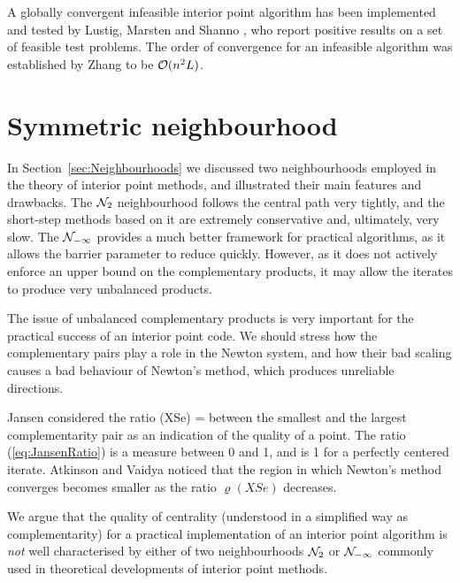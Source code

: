 A globally convergent infeasible interior point algorithm has
been implemented and tested by Lustig, Marsten and Shanno
\cite{LustigMarstenShanno94b}, who report positive results on
a set of feasible test problems.
The order of convergence for an infeasible algorithm was
established by Zhang \cite{Zhang94} to be $\mathcal{O}(n^2L)$.


%
%
\section{Symmetric neighbourhood}
\label{sec:SymNeighbourhood}

In Section~\ref{sec:Neighbourhoods} we discussed two neighbourhoods
employed in the theory of interior point methods, 
and illustrated their main features and drawbacks.
The $\mathcal{N}_2$ neighbourhood follows the central path very tightly, 
and the short-step methods
based on it are extremely conservative and, ultimately, very slow.
The $\mathcal{N}_{-\infty}$ provides a much better framework 
for practical algorithms, as it allows 
the barrier parameter to reduce quickly. However, as it does not actively
enforce an upper bound on the complementary products, it may allow the
iterates to produce very unbalanced products.

The issue of unbalanced complementary products is very important for
the practical success of an interior point code. 
We should stress how
the complementary pairs play a role in the Newton system, and how
their bad scaling causes a bad behaviour of Newton's method, which
produces unreliable directions.

Jansen \cite{phd:Jansen} considered the ratio 
\be  \label{eq:JansenRatio}
  \varrho(XSe) = 
\ee
between the smallest and the largest complementarity pair as an 
indication of the quality of a point.
The ratio (\ref{eq:JansenRatio}) is a measure between 0 and 1, and is 1
for a perfectly centered iterate.
Atkinson and Vaidya \cite{AtkinsonVaidya} noticed that 
the region in which Newton's method converges becomes smaller
as the ratio $\varrho(XSe)$ decreases. 

We argue that the quality of centrality 
(understood in a simplified way as complementarity)
for a practical implementation of an interior point algorithm
is {\it not} well characterised by either of two neighbourhoods 
$\mathcal{N}_2$ or $\mathcal{N}_{-\infty}$ commonly used in theoretical developments 
of interior point methods.

